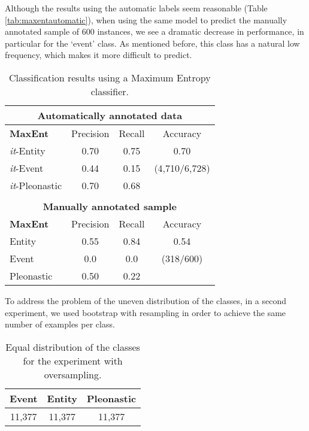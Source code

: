 \documentclass[10pt, a4paper]{article} \usepackage{lrec} \usepackage{multibib}
\begin{document}
 Although the results using the automatic labels seem reasonable (Table  \ref{tab:maxentautomatic}), when using the same model to predict the manually annotated sample of 600 instances, we see a dramatic decrease in performance, in particular for the `event' class. As mentioned before, this class has a natural low frequency, which makes it more difficult to predict. 

\begin{center} \begin{table}[h!]\centering 
\begin{tabular}{l ccc}
\multicolumn{4}{c}{ \textbf{Automatically annotated data}}\\ 
\toprule
\textbf{MaxEnt}& Precision & Recall & Accuracy \\ 
\midrule 
\textit{it}-Entity &0.70 & 0.75 &   0.70\\
\textit{it}-Event & 0.44 & 0.15 & (4,710/6,728) \\
\textit{it}-Pleonastic & 0.70 & 0.68&   \\ 
\midrule & & & \\
\multicolumn{4}{c}{\textbf{Manually annotated sample}}  \\ 
\midrule
\textbf{MaxEnt}& Precision & Recall & Accuracy \\ 
\midrule 
Entity &0.55 & 0.84 &0.54\\ 
Event &0.0 & 0.0 & (318/600)\\ 
Pleonastic & 0.50 & 0.22 & \\ 
\bottomrule
\end{tabular} \caption{Classification results using a Maximum Entropy
classifier.} 
\end{table}\label{tab:maxentautomatic}
\end{center}

To address the problem of the uneven distribution of the classes, in a second experiment, we used bootstrap with resampling in order to achieve the same number of examples per class. 

\begin{table}[h!]\centering
\begin{tabular}{ccc}
\toprule
\textbf{Event} & \textbf{Entity} & \textbf{Pleonastic} \\
\midrule
11,377 & 11,377 & 11,377 \\
\bottomrule
\end{tabular}
\caption{Equal distribution of the classes for the experiment with oversampling.}
\end{table}
\end{document}
